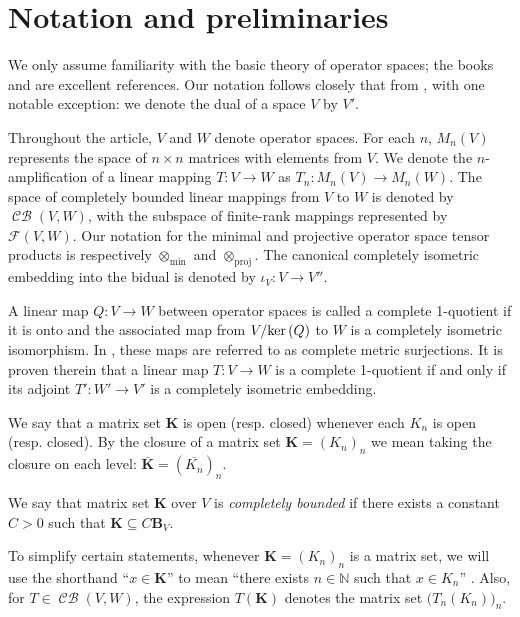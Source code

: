 \documentclass[11pt]{amsart}
\DeclareMathOperator{\CB}{\mathcal{CB}}
\DeclareMathOperator{\proj}{proj}
\numberwithin{equation}{section}
\def\ker{{\rm ker\, }}
\begin{document}
\section{Notation and preliminaries}\label{sec-preliminaries}






We only assume familiarity with the basic theory of operator spaces; the books \cite{Pisier-OS-theory} and \cite{Effros-Ruan-book} are excellent references. Our notation follows closely that from \cite{Pisier-Asterisque, Pisier-OS-theory}, with one notable exception: we denote the dual of a space $V$ by $V'$.

Throughout the article, $V$ and $W$ denote operator spaces. For each $n$, $M_n(V)$ represents the space of $n\times n$ matrices with elements from $V$. We denote the $n$-amplification of a linear mapping $T:V\to W$ as $T_n:M_n(V)\to M_n(W)$. The space of completely bounded linear mappings from $V$ to $W$ is denoted by $\CB(V,W)$, with the subspace of finite-rank mappings represented by $\mathcal{F}(V,W)$. Our notation for the minimal and projective operator space tensor products is respectively $\otimes_{\min}$ and $\otimes_{\proj}$. The canonical completely isometric embedding into the bidual is denoted by $\iota_V : V \to V''$.

A linear map $Q : V \to W$ between operator spaces is called a complete 1-quotient  if it is onto and the associated map from $V/\ker(Q)$ to $W$ is a completely isometric isomorphism.
In \cite[Sec. 2.4]{Pisier-OS-theory}, these maps are referred to as complete metric surjections. It is proven therein that a linear map $T:V \to W$ is a complete 1-quotient if and only if its adjoint $T' : W' \to V'$ is a completely isometric embedding.


 We say that a matrix set $\mathbf{K}$ is open (resp. closed) whenever each $K_n$ is open (resp. closed). By the closure of a matrix set $\mathbf{K} = (K_n)_n$ we mean taking the closure on each level: $\overline{\mathbf{K}} = ( \overline{K_n})_n$. 

We say that matrix set $\mathbf{K}$ over $V$ is \emph{completely bounded} if there exists a constant $C>0$ such that $\mathbf{K} \subseteq C \mathbf{B}_V$. 

To simplify certain statements, whenever $\mathbf{K} = (K_n)_n$ is a matrix set, we will use the shorthand ``$x \in \mathbf{K}$'' to mean ``there exists $n \in \mathbb{N}$ such that $x \in K_n$'' . Also, for $T\in\CB(V,W)$, the expression $T(\mathbf{K})$ denotes the matrix set $\big(T_n(K_n)\big)_n$.
\end{document}
